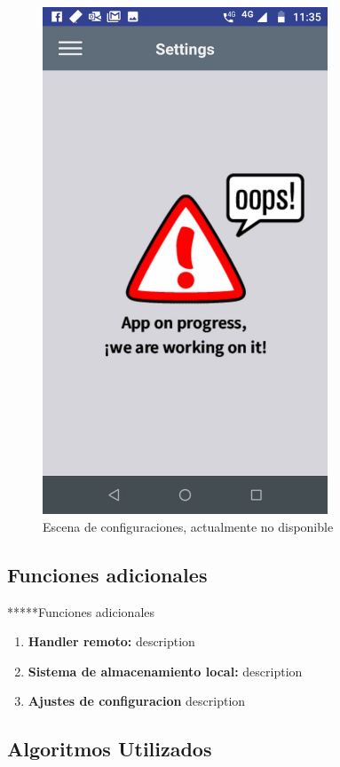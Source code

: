 \begin{figure}[htbp]
	\centerline{\includegraphics[width=8.5cm]{./figuras/mobile_settings.jpeg}}
	\caption{Escena de configuraciones, actualmente no disponible}
	\label{fig_18}
\end{figure}



\subsection{Funciones adicionales}

*****Funciones adicionales


\begin{enumerate}
	\item \textbf{Handler remoto:} description
	
	\item \textbf{Sistema de almacenamiento local:} description
	
	\item \textbf{Ajustes de configuracion} description
	
\end{enumerate}

\subsection{Algoritmos Utilizados}

